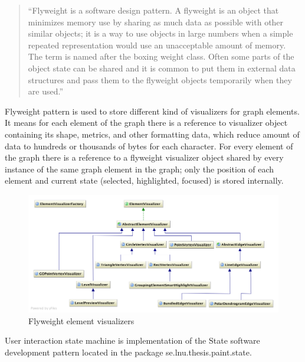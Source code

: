 \begin{quotation}
``Flyweight is a software design pattern.
A flyweight is an object that minimizes memory use by sharing as much data as possible with other similar objects;
it is a way to use objects in large numbers when a simple repeated representation would use an unacceptable amount of memory.
The term is named after the boxing weight class.
Often some parts of the object state can be shared and it is common to put them in external data structures and pass them to
the flyweight objects temporarily when they are used.''~\cite{FLYWEIGHT}
\end{quotation}

Flyweight pattern is used to store different kind of visualizers for graph elements. It means for each element of the graph there is a reference to visualizer object containing its shape, metrics, and other formatting data, which reduce amount of data to hundreds or thousands of bytes for each character. For every element of the graph there is a reference to a flyweight visualizer object shared by every instance of the same graph element in the graph; only the position of each element and current state (selected, highlighted, focused) is stored internally.

\begin{figure}[h!]
\centering
\includegraphics[scale=0.35]{pictures/uml_visualizers.png}
\caption{Flyweight element visualizers}
\label{fig:uml_visualizers}
\end{figure}

User interaction state machine is implementation of the State software development pattern located in the package \textsf{se.lnu.thesis.paint.state}.

